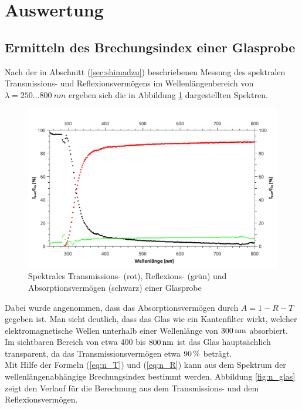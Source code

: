 \section{Auswertung}
\subsection{Ermitteln des Brechungsindex einer Glasprobe}
	Nach der in Abschnitt (\ref{sec:shimadzu}) beschriebenen Messung des spektralen Transmissions- und Reflexionsvermögens im Wellenlängenbereich von $\lambda = 250\dots800\ \unit{nm}$ ergeben sich die in Abbildung \ref{fig:R_T_glas} dargestellten Spektren.
	\begin{figure}[ht]
		\centering
		\includegraphics[width=\linewidth]{pic/R_T_glas.pdf}
		\caption{Spektrales Transmissions- (rot), Reflexions- (grün) und Absorptionsvermögen (schwarz) einer Glasprobe}
		\label{fig:R_T_glas}
	\end{figure}
	Dabei wurde angenommen, dass das Absorptionsvermögen durch $A = 1 - R - T$ gegeben ist. Man sieht deutlich, dass das Glas wie ein Kantenfilter wirkt, welcher elektromagnetische Wellen unterhalb einer Wellenlänge von $\unit[300]{nm}$ absorbiert. Im sichtbaren Bereich von etwa 400 bis $\unit[800]{nm}$ ist das Glas hauptsächlich transparent, da das Transmissionsvermögen etwa $\unit[90]{\%}$ beträgt.\\
	Mit Hilfe der Formeln (\ref{eq:n_T}) und (\ref{eq:n_R}) kann aus dem Spektrum der wellenlängenabhängige Brechungsindex bestimmt werden. Abbildung \ref{fig:n_glas} zeigt den Verlauf für die Berechnung aus dem Transmissions- und dem Reflexionsvermögen.
